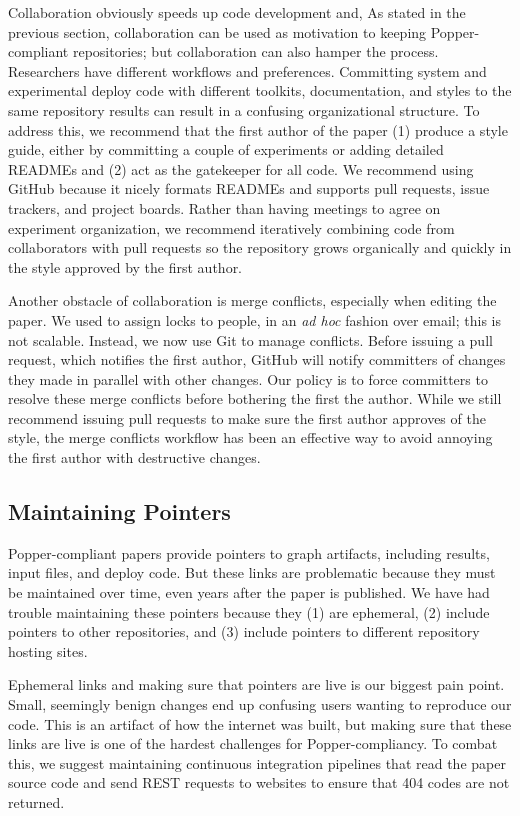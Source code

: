 Collaboration obviously speeds up code development and, As stated in the
previous section, collaboration can be used as motivation to keeping
Popper-compliant repositories; but collaboration can also hamper the process.
Researchers have different workflows and preferences. Committing system and
experimental deploy code with different toolkits, documentation, and styles to
the same repository results can result in a confusing organizational structure.
To address this, we recommend that the first author of the paper (1) produce a
style guide, either by committing a couple of experiments or adding detailed
READMEs and (2) act as the gatekeeper for all code. We recommend using GitHub
because it nicely formats READMEs and supports pull requests, issue trackers,
and project boards. Rather than having meetings to agree on experiment
organization, we recommend iteratively combining code from collaborators with
pull requests so the repository grows organically and quickly in the style
approved by the first author.

Another obstacle of collaboration is merge conflicts, especially when editing
the paper. We used to assign locks to people, in an {\it ad hoc} fashion over
email; this is not scalable. Instead, we now use Git to manage conflicts.
Before issuing a pull request, which notifies the first author, GitHub will
notify committers of changes they made in parallel with other changes. Our
policy is to force committers to resolve these merge conflicts before bothering
the first the author. While we still recommend issuing pull requests to make
sure the first author approves of the style, the merge conflicts workflow has
been an effective way to avoid annoying the first author with destructive
changes.

\subsection{Maintaining Pointers}

Popper-compliant papers provide pointers to graph artifacts, including results,
input files, and deploy code. But these links are problematic because they must
be maintained over time, even years after the paper is published. We have had
trouble maintaining these pointers because they (1) are ephemeral, (2) include
pointers to other repositories, and (3) include pointers to different
repository hosting sites.

Ephemeral links and making sure that pointers are live is our biggest pain
point. Small, seemingly benign changes end up confusing users wanting to
reproduce our code. This is an artifact of how the internet was built, but
making sure that these links are live is one of the hardest challenges for
Popper-compliancy. To combat this, we suggest maintaining continuous
integration pipelines that read the paper source code and send REST requests to
websites to ensure that 404 codes are not returned.


